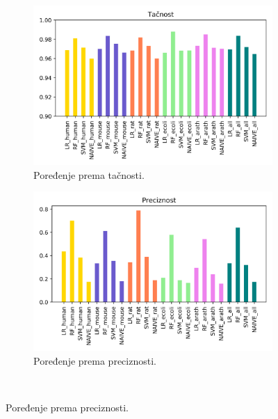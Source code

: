\begin{figure}[H]
	\begin{subfigure}{0.5\textwidth}
		\centering
		\includegraphics[width=\textwidth]{Figures/acc_poredjenje.png}
		\caption{Poređenje prema tačnosti. }
		\label{fig:accscores}
	\end{subfigure}
	\begin{subfigure}{0.5\textwidth}
		\centering
		\includegraphics[width=\textwidth]{Figures/pre_poredjenje.png}
		\caption{Poređenje prema preciznosti. }
		\label{fig:prescores}
	\end{subfigure}

~
	\newline
	\newline
~


\end{figure}
